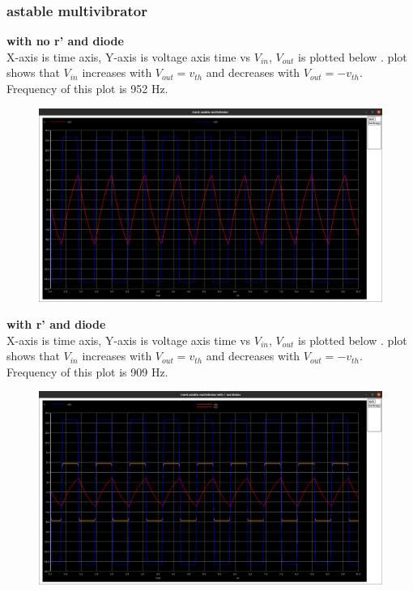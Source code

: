 \documentclass[12pt]{article}
\begin{document}
\subsubsection{astable multivibrator}
\textbf{with no r' and diode\\}
X-axis is time axis, Y-axis is voltage axis time vs \(V_{in}\), \(V_{out}\) is plotted below . plot shows that \(V_{in}\) increases with \(V_{out}=v_{th}\) and decreases with \(V_{out}=-v_{th}\). Frequency of this plot is 952 Hz.
\begin{figure}[h!]
\centering
\includegraphics[scale = 0.2]{q2_nrd.png}
\end{figure}
\newpage
\textbf{with r' and diode\\}
X-axis is time axis, Y-axis is voltage axis time vs \(V_{in}\), \(V_{out}\) is plotted below . plot shows that \(V_{in}\) increases with \(V_{out}=v_{th}\) and decreases with \(V_{out}=-v_{th}\). Frequency of this plot is 909 Hz.
\begin{figure}[h!]
\centering
\includegraphics[scale = 0.2]{q2_rd.png}
\end{figure}
\newpage
\end{document}
